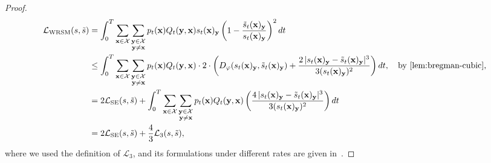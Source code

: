 \documentclass{article} %
\newcommand{\bfx}{{\bf x}}
\newcommand{\bfy}{ {\bf y}}
\newcommand{\LWRSM}{\mathcal{L}_{\mathrm{WRSM}}}
\newcommand{\LSE}{\mathcal{L}_{\mathrm{SE}}}
\newcommand{\LThree}{\mathcal{L}_{3}}
\begin{document}
\begin{proof}
    \begin{align*}
        \LWRSM(s, \tilde{s}) &= \int_0^T \sum_{\substack{\bfx\in\mathcal{X}}} \sum_{\substack{\bfy\in\mathcal{X} \\ \bfy\neq \bfx}} p_t(\bfx) Q_t(\bfy, \bfx) s_t(\bfx)_\bfy \left( 1 - \frac{\tilde{s}_t(\bfx)_\bfy}{s_t(\bfx)_\bfy} \right) ^2  dt\\
        & \leq \int_0^T \sum_{\substack{\bfx\in\mathcal{X}}} \sum_{\substack{\bfy\in\mathcal{X} \\ \bfy\neq \bfx}} p_t(\bfx) Q_t(\bfy, \bfx) \cdot 2   \cdot \left( D_\varphi(s_t(\bfx)_\bfy, \tilde{s}_t(\bfx)_\bfy) + \frac{2\,|s_t(\bfx)_\bfy - \tilde{s}_t(\bfx)_\bfy|^3}{3 (s_t(\bfx)_\bfy)^2} \right) dt, \quad \text{by \Cref{lem:bregman-cubic},}\\
        & = 2 \LSE(s, \tilde{s}) +  \int_0^T \sum_{\substack{\bfx\in\mathcal{X}}} \sum_{\substack{\bfy\in\mathcal{X} \\ \bfy\neq \bfx}} p_t(\bfx) Q_t(\bfy, \bfx) \left( \frac{4\,|s_t(\bfx)_\bfy - \tilde{s}_t(\bfx)_\bfy|^3}{3 (s_t(\bfx)_\bfy)^2} \right) dt \\
         &= 2 \LSE(s, \tilde{s}) +  \frac{4}{3} {\LThree(s, \tilde{s})},
    \end{align*}
    where we used the definition of $\LThree$, and its formulations under different rates are given in~.
\end{proof}
\end{document}
